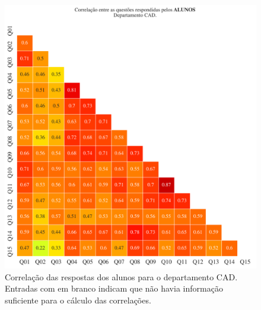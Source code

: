 \documentclass[a4paper,10pt]{article}
\begin{document}
\begin{figure}[h]
\centering
\includegraphics[width=0.999\linewidth]{matriz_corr__CAD_alunos.png}
\caption{\label{fig:corr_alunos}Correlação das respostas dos alunos para o departamento CAD. Entradas com em branco indicam que não havia informação suficiente para o cálculo das correlações.}
\end{figure}
\end{document}
